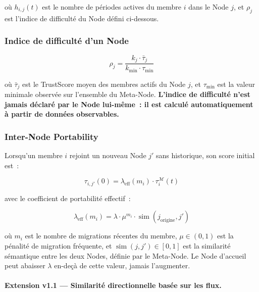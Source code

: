 \documentclass[12pt,a4paper]{article}
\theoremstyle{definition}
\theoremstyle{plain}
\theoremstyle{remark}
\newcommand{\trustscore}{\tau}
\newcommand{\1}{\mathbf{1}}
\begin{document}
où $h_{i,j}(t)$ est le nombre de périodes actives du membre $i$ dans le Node
$j$, et $\rho_j$ est l'indice de difficulté du Node défini ci-dessous.

\subsubsection{Indice de difficulté d'un Node}

\begin{equation}
\rho_j = \frac{k_j \cdot \bar{\trustscore}_j}{k_{\min} \cdot \trustscore_{\min}}
\label{eq:difficulty}
\end{equation}

où $\bar{\trustscore}_j$ est le TrustScore moyen des membres actifs du Node
$j$, et $\trustscore_{\min}$ est la valeur minimale observée sur l'ensemble du
Meta-Node. \textbf{L'indice de difficulté n'est jamais déclaré par le Node
lui-même~: il est calculé automatiquement à partir de données observables.}

\subsubsection{Inter-Node Portability}

Lorsqu'un membre $i$ rejoint un nouveau Node $j'$ sans historique, son score
initial est~:

\begin{equation}
\trustscore_{i,j'}(0) = \lambda_{\text{eff}}(m_i) \cdot \trustscore_i^{\mathcal{M}}(t)
\label{eq:portability}
\end{equation}

avec le coefficient de portabilité effectif~:

\begin{equation}
\lambda_{\text{eff}}(m_i) = \lambda \cdot \mu^{m_i} \cdot \operatorname{sim}(j_{\text{origine}}, j')
\label{eq:lambda_eff}
\end{equation}

où $m_i$ est le nombre de migrations récentes du membre, $\mu \in (0,1)$ est
la pénalité de migration fréquente, et $\operatorname{sim}(j, j') \in [0,1]$
est la similarité sémantique entre les deux Nodes, définie par le Meta-Node.
Le Node d'accueil peut abaisser $\lambda$ en-deçà de cette valeur, jamais
l'augmenter.

\paragraph{Extension v1.1 --- Similarité directionnelle basée sur les flux.}
\end{document}
